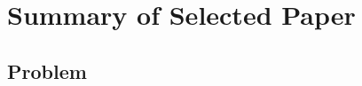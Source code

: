 \documentclass[12pt,journal,compsoc,onecolumn]{IEEEtran}
\begin{document}
%
%
%

\section{Summary of Selected Paper}
\subsection{Problem}
\end{document}
